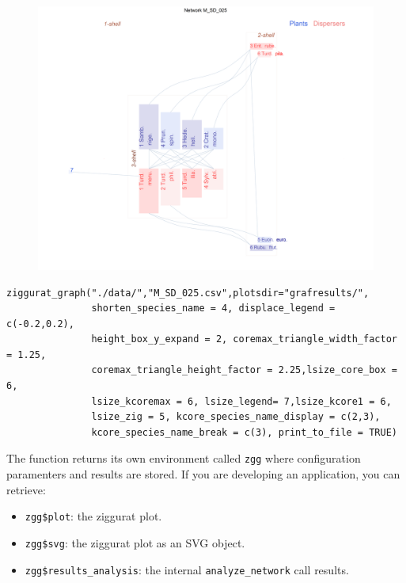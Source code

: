 \documentclass[12pt]{article}
\begin{document}
\begin{figure}[hp!]
\centering
\includegraphics[scale=0.4]{M_SD_025_ziggurat.png}
\label{fig:KMAN_ziggurat_025}
\end{figure}

\fontsize{3.5mm}{3.5mm}\selectfont
\begin{verbatim}
ziggurat_graph("./data/","M_SD_025.csv",plotsdir="grafresults/",
               shorten_species_name = 4, displace_legend = c(-0.2,0.2),
               height_box_y_expand = 2, coremax_triangle_width_factor = 1.25,
               coremax_triangle_height_factor = 2.25,lsize_core_box = 6,
               lsize_kcoremax = 6, lsize_legend= 7,lsize_kcore1 = 6, 
               lsize_zig = 5, kcore_species_name_display = c(2,3), 
               kcore_species_name_break = c(3), print_to_file = TRUE)

\end{verbatim}
\normalsize

\clearpage

\noindent The function returns its own environment called \texttt{zgg} where configuration paramenters and results
are stored. If you are developing an application, you can retrieve:

\begin{itemize}

\item \texttt{zgg\$plot}:  the ziggurat plot.

\item \texttt{zgg\$svg}: the ziggurat plot as an SVG object.

\item \texttt{zgg\$results\_analysis}: the internal \texttt{analyze\_network} call results.

\end{itemize}
 
\end{document}

